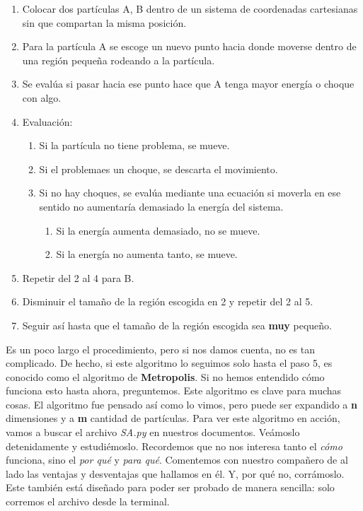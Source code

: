 \documentclass[10pt,letterpaper]{article}
\begin{document}
\begin{enumerate}
\item Colocar dos part\'iculas A, B dentro de un sistema de coordenadas cartesianas sin que compartan la misma posici\'on.
\item Para la part\'icula A se escoge un nuevo punto hacia donde moverse dentro de una regi\'on peque\~na rodeando a la part\'icula.
\item Se eval\'ua si pasar hacia ese punto hace que A tenga mayor energ\'ia o choque con algo.
\item Evaluaci\'on:
\begin{enumerate}
\item Si la part\'icula no tiene problema, se mueve.
\item Si el problemaes un choque, se descarta el movimiento.
\item Si no hay choques, se eval\'ua mediante una ecuaci\'on si moverla en ese sentido no aumentar\'ia demasiado la energ\'ia del sistema.
\begin{enumerate}
\item Si la energ\'ia aumenta demasiado, no se mueve.
\item Si la energ\'ia no aumenta tanto, se mueve.
\end{enumerate}
\end{enumerate}
\item Repetir del 2 al 4 para B.
\item Disminuir el tama\~no de la regi\'on escogida en 2 y repetir del 2 al 5.
\item Seguir as\'i hasta que el tama\~no de la regi\'on escogida sea \textbf{muy} peque\~no.
\end{enumerate}

Es un poco largo el procedimiento, pero si nos damos cuenta, no es tan complicado. De hecho, si este algoritmo lo seguimos solo hasta el paso 5, es conocido como el algoritmo de \textbf{Metropolis}. Si no hemos entendido c\'omo funciona esto hasta ahora, preguntemos. Este algoritmo es clave para muchas cosas. El algoritmo fue pensado as\'i como lo vimos, pero puede ser expandido a \textbf{n} dimensiones y a \textbf{m} cantidad de part\'iculas. Para ver este algoritmo en acci\'on, vamos a buscar el archivo \textit{SA.py} en nuestros documentos. Ve\'amoslo detenidamente y estudi\'emoslo. Recordemos que no nos interesa tanto el \emph{c\'omo} funciona, sino el \emph{por qu\'e} y \emph{para qu\'e}. Comentemos con nuestro compa\~nero de al lado las ventajas y desventajas que hallamos en \'el. Y, por qu\'e no, corr\'amoslo. Este tambi\'en est\'a dise\~nado para poder ser probado de manera sencilla: solo corremos el archivo desde la terminal.
\end{document}
